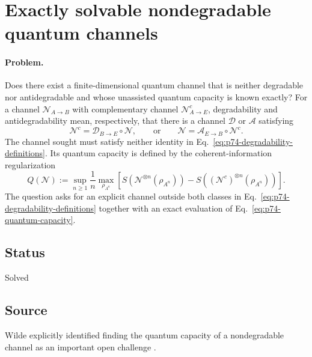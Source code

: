 \section{Exactly solvable nondegradable quantum channels}
\label{sec:op_a59d7cc1c843edb5}

\paragraph{Problem.}
Does there exist a finite-dimensional quantum channel that is neither
degradable nor antidegradable and whose unassisted quantum capacity is known
exactly?  For a channel $\mathcal N_{A\to B}$ with complementary channel
$\mathcal N^c_{A\to E}$, degradability and antidegradability mean,
respectively, that there is a channel $\mathcal D$ or $\mathcal A$ satisfying
\begin{equation}
  \mathcal N^c=\mathcal D_{B\to E}\circ\mathcal N,
  \qquad\text{or}\qquad
  \mathcal N=\mathcal A_{E\to B}\circ\mathcal N^c.
  \label{eq:p74-degradability-definitions}
\end{equation}
The channel sought must satisfy neither identity in
Eq.~\eqref{eq:p74-degradability-definitions}.  Its quantum capacity is
defined by the coherent-information regularization
\begin{equation}
  Q(\mathcal N)
  :=\sup_{n\geq1}\frac1n\max_{\rho_{A^n}}
  \left[
    S(\mathcal N^{\otimes n}(\rho_{A^n}))
    -S((\mathcal N^c)^{\otimes n}(\rho_{A^n}))
  \right].
  \label{eq:p74-quantum-capacity}
\end{equation}
The question asks for an explicit channel outside both classes in
Eq.~\eqref{eq:p74-degradability-definitions} together with an exact evaluation
of Eq.~\eqref{eq:p74-quantum-capacity}.

\subsection*{Status}

Solved

\subsection*{Source}

Wilde explicitly identified finding the quantum capacity of a nondegradable
channel as an important open challenge
.

